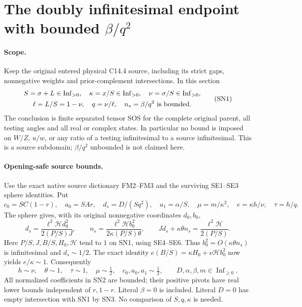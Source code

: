 \section{The doubly infinitesimal endpoint with bounded $\beta/q^2$}
\label{sec:new-c144-small-nu-bounded-beta}

\paragraph{Scope.}
Keep the original entered physical C14.4 source, including its strict
gaps, nonnegative weights and prior-complement intersections. In this
section
\[
 \begin{gathered}
 S=\sigma+L\in\operatorname{Inf}_{>0},\quad
 \kappa=x/S\in\operatorname{Inf}_{>0},\quad
 \nu=\sigma/S\in\operatorname{Inf}_{>0},\\
 \ell=L/S=1-\nu,\quad q=\nu/\ell,\quad
 n_s=\beta/q^2\ \hbox{is bounded}.
 \end{gathered}
 \tag{SN1}
\]
The conclusion is finite separated tensor SOS for the complete original
parent, all testing angles and all real or complex states. In particular
no bound is imposed on $W/Z$, $u/w$, or any ratio of a testing
infinitesimal to a source infinitesimal. This is a source subdomain;
$\beta/q^2$ unbounded is not claimed here.

\paragraph{Opening-safe source bounds.}
Use the exact native source dictionary FM2--FM3 and the surviving
SE1--SE3 sphere identities. Put
\[
 c_0=SC(1-r),\quad a_0=SAr,\quad d_s=D/(Sq^2),\quad
 a_1=\alpha/S,\quad \mu=m/\kappa^2,\quad
 e=\kappa h/\nu,\quad \tau=h/q.
 \tag{SN2}
\]
The sphere gives, with its original nonnegative coordinates $d_0,b_0$,
\[
 d_s=\frac{\ell^2\mathcal H d_0^2}{2(P/S)J},\qquad
 n_s=\frac{\ell^2\mathcal H b_0^2}{2\kappa(P/S)\theta},\qquad
 Jd_s+\kappa\theta n_s=\frac{\ell^2\mathcal H}{2(P/S)}.
 \tag{SN3}
\]
Here $P/S,J,B/S,H_0,\mathcal H$ tend to $1$ on SN1, using SE4--SE6.
Thus $b_0^2=O(\kappa\theta n_s)$ is infinitesimal and $d_s\sim1/2$.
The exact identity $e(B/S)=\kappa H_0+\nu\mathcal H b_0^2$ now yields
$e/\kappa\sim1$. Consequently
\[
 h\sim\nu,\quad\theta\sim1,\quad\tau\sim1,\quad
 \mu\sim\tfrac12,\quad c_0,a_0,a_1\sim\tfrac12,
 \qquad D,\alpha,\beta,m\in\operatorname{Inf}_{\ge0}.
 \tag{SN4}
\]
All normalized coefficients in SN2 are bounded; their positive pivots
have real lower bounds independent of $r,1-r$. Literal $\beta=0$ is
included. Literal $D=0$ has empty intersection with SN1 by SN3. No
comparison of $S,q,\kappa$ is needed.

